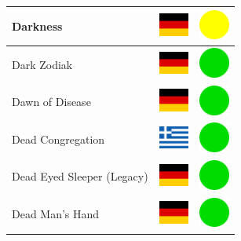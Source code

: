 \documentclass[12pt, a4paper, twoside]{report}
\begin{document}
\begin{center}
\begin{longtable}{|p{5cm}|p{2cm}|p{2cm}|}
Darkness & \includegraphics[width=1cm]{4x3/de} & \includegraphics[width=1cm]{likes/m} \\ \hline
Dark Zodiak & \includegraphics[width=1cm]{4x3/de} & \includegraphics[width=1cm]{likes/y} \\ \hline
Dawn of Disease & \includegraphics[width=1cm]{4x3/de} & \includegraphics[width=1cm]{likes/y} \\ \hline
Dead Congregation & \includegraphics[width=1cm]{4x3/gr} & \includegraphics[width=1cm]{likes/y} \\ \hline
Dead Eyed Sleeper (Legacy) & \includegraphics[width=1cm]{4x3/de} & \includegraphics[width=1cm]{likes/y} \\ \hline
Dead Man's Hand & \includegraphics[width=1cm]{4x3/de} & \includegraphics[width=1cm]{likes/y} \\ \hline

\end{longtable}
\end{center}
\end{document}
